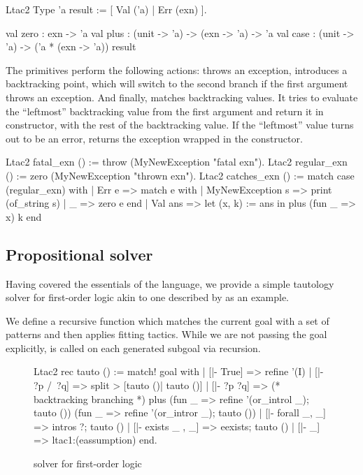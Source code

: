 \begin{coq}
Ltac2 Type 'a result := [ Val ('a) | Err (exn) ].

val zero : exn -> 'a
val plus : (unit -> 'a) -> (exn -> 'a) -> 'a
val case : (unit -> 'a) -> ('a * (exn -> 'a)) result
\end{coq}

The primitives perform the following actions:  throws an exception,  introduces a backtracking point, which will switch to the second branch if the first argument throws an exception.
And finally,  matches backtracking values.
It tries to evaluate the ``leftmost'' backtracking value from the first argument and return it in  constructor, with the rest of the backtracking value.
If the ``leftmost'' value turns out to be an error,  returns the exception wrapped in the  constructor.

\begin{coq}
Ltac2 fatal_exn () := throw (MyNewException "fatal exn").
Ltac2 regular_exn () := zero (MyNewException "thrown exn").
Ltac2 catches_exn () := match case (regular_exn) with
| Err e => match e with
  | MyNewException s => print (of_string s)
  | _ => zero e
  end
| Val ans => let (x, k) := ans in
  plus (fun _ => x) k
end
\end{coq}

\subsection{Propositional solver}
\label{sec:propositional-solver}

Having covered the essentials of the language, we provide a simple tautology solver for first-order logic akin to one described by \citet{zilianiMtacMonadTyped2013} as an example.

We define a recursive function  which matches the current goal with a set of patterns and then applies fitting tactics.
While we are not passing the goal explicitly,  is called on each generated subgoal via recursion.

\begin{figure}[H]
\begin{coq}
Ltac2 rec tauto () :=
  match! goal with
  | [|- True] =>
    refine '(I)
  | [|- ?p /\ ?q] =>
    split > [tauto ()| tauto ()]
  | [|- ?p \/ ?q] =>
    (* backtracking branching *)
    plus (fun _ => refine '(or_introl _); tauto ())
         (fun _ => refine '(or_intror _); tauto ())
  | [|- forall _, _] =>
    intros ?; tauto ()
  | [|- exists _ , _] =>
    eexists; tauto ()
  | [|- _] => ltac1:(eassumption)
  end.
\end{coq}
\caption{solver for first-order logic}
\label{fig:ltac2-solver}
\end{figure}

